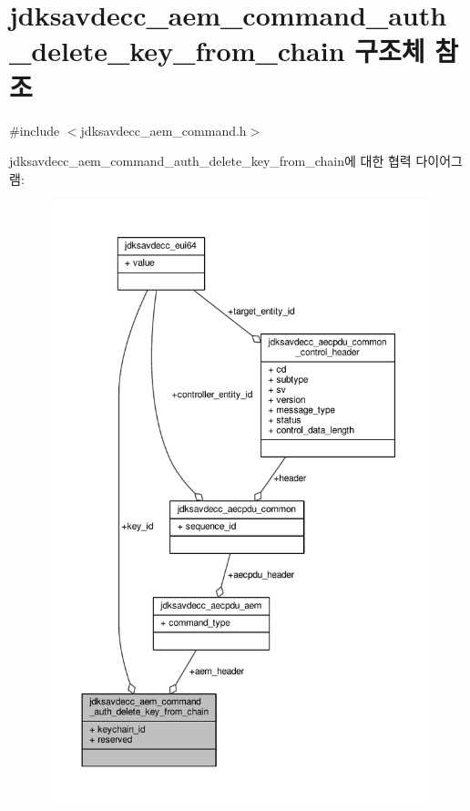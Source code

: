\hypertarget{structjdksavdecc__aem__command__auth__delete__key__from__chain}{}\section{jdksavdecc\+\_\+aem\+\_\+command\+\_\+auth\+\_\+delete\+\_\+key\+\_\+from\+\_\+chain 구조체 참조}
\label{structjdksavdecc__aem__command__auth__delete__key__from__chain}


{\ttfamily \#include $<$jdksavdecc\+\_\+aem\+\_\+command.\+h$>$}



jdksavdecc\+\_\+aem\+\_\+command\+\_\+auth\+\_\+delete\+\_\+key\+\_\+from\+\_\+chain에 대한 협력 다이어그램\+:
\nopagebreak
\begin{figure}[H]
\begin{center}
\leavevmode
\includegraphics[width=350pt]{structjdksavdecc__aem__command__auth__delete__key__from__chain__coll__graph}
\end{center}
\end{figure}
